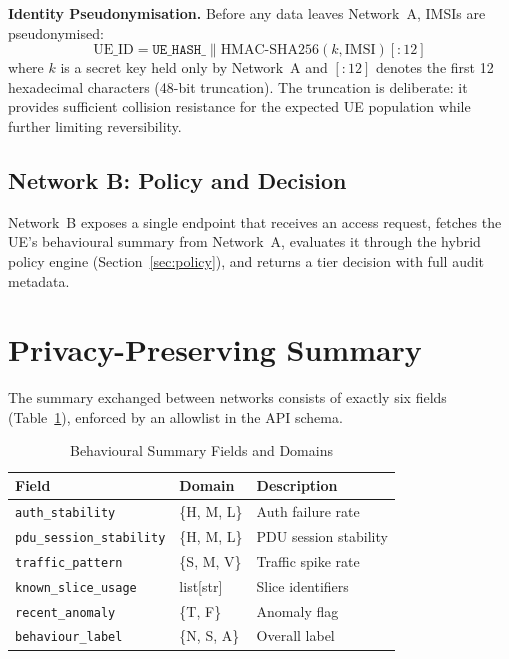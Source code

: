\documentclass[conference]{IEEEtran}
\begin{document}
\textbf{Identity Pseudonymisation.} Before any data leaves Network~A, IMSIs are pseudonymised:
\begin{equation}
    \text{UE\_ID} = \texttt{UE\_HASH\_} \| \text{HMAC-SHA256}(k, \text{IMSI})[{:}12]
\end{equation}
where $k$ is a secret key held only by Network~A and $[{:}12]$ denotes the first 12 hexadecimal characters (48-bit truncation). The truncation is deliberate: it provides sufficient collision resistance for the expected UE population while further limiting reversibility.

\subsection{Network B: Policy and Decision}
Network~B exposes a single endpoint that receives an access request, fetches the UE's behavioural summary from Network~A, evaluates it through the hybrid policy engine (Section~\ref{sec:policy}), and returns a tier decision with full audit metadata.

\section{Privacy-Preserving Summary}
\label{sec:privacy}

The summary exchanged between networks consists of exactly six fields (Table~\ref{tab:summary_fields}), enforced by an allowlist in the API schema.

\begin{table}[t]
\centering
\caption{Behavioural Summary Fields and Domains}
\label{tab:summary_fields}
\begin{tabular}{@{}lll@{}}
\toprule
\textbf{Field} & \textbf{Domain} & \textbf{Description} \\
\midrule
\texttt{auth\_stability} & \{H, M, L\} & Auth failure rate \\
\texttt{pdu\_session\_stability} & \{H, M, L\} & PDU session stability \\
\texttt{traffic\_pattern} & \{S, M, V\} & Traffic spike rate \\
\texttt{known\_slice\_usage} & list[str] & Slice identifiers \\
\texttt{recent\_anomaly} & \{T, F\} & Anomaly flag \\
\texttt{behaviour\_label} & \{N, S, A\} & Overall label \\
\bottomrule
\end{tabular}
\end{table}
\end{document}
